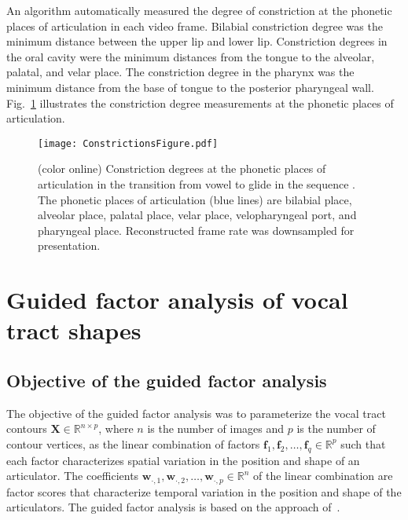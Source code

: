 \documentclass[preprint]{JASAnew}\usepackage[]{graphicx}\usepackage[]{color}
\begin{document}
An algorithm automatically measured the degree of constriction at the phonetic places of articulation in each video frame. Bilabial constriction degree was the minimum distance between the upper lip and lower lip. Constriction degrees in the oral cavity were the minimum distances from the tongue to the alveolar, palatal, and velar place. The constriction degree in the pharynx was the minimum distance from the base of tongue to the posterior pharyngeal wall. 
%
Fig.~\ref{fig:constrictions} illustrates the constriction degree measurements at the phonetic places of articulation.


\begin{figure}

\texttt{[image: ConstrictionsFigure.pdf]}

\caption{(color online) Constriction degrees at the phonetic places of articulation in the transition from vowel \textipa{[a]} to glide \textipa{[j]} in the sequence \textipa{[aja]}. The phonetic places of articulation (blue lines) are bilabial place, alveolar place, palatal place, velar place, velopharyngeal port, and pharyngeal place. Reconstructed frame rate was downsampled for presentation.}
\label{fig:constrictions}
\end{figure}




\section{Guided factor analysis of vocal tract shapes}
\label{sec:gfa}




\subsection{Objective of the guided factor analysis}
\label{subsec:objectivesoftheguidedfactoranalysis}

The objective of the guided factor analysis was to parameterize the vocal tract contours $\mathbf{X} \in \mathbb{R}^{n\times p}$, where $n$ is the number of images and $p$ is the number of contour vertices, as the linear combination of factors $\mathbf{f}_1, \mathbf{f}_2, \ldots, \mathbf{f}_q \in \mathbb{R}^p$ such that each factor characterizes spatial variation in the position and shape of an articulator. 
%
The coefficients $\mathbf{w}_{\cdot,1},\mathbf{w}_{\cdot,2},\ldots,\mathbf{w}_{\cdot,p} \in \mathbb{R}^n$ of the linear combination are factor scores that characterize temporal variation in the position and shape of the articulators. 
%
The guided factor analysis is based on the approach of~\citet{toutios2015factor}.
\end{document}
